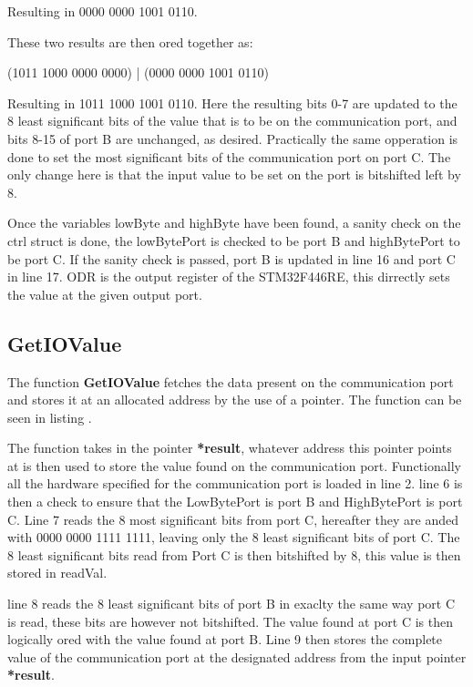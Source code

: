 Resulting in 0000 0000 1001 0110. 

These two results are then ored together as:

(1011 1000 0000 0000) | (0000 0000 1001 0110) 

Resulting in 1011 1000 1001 0110. Here the resulting bits 0-7 are updated to the 8 least significant bits of the value that is to be on the communication port, and bits 8-15 of port B are unchanged, as desired. Practically the same opperation is done to set the most significant bits of the communication port on port C. The only change here is that the input value to be set on the port is bitshifted left by 8.

Once the variables lowByte and highByte have been found, a sanity check on the ctrl struct is done, the lowBytePort is checked to be port B and highBytePort to be port C. If the sanity check is passed, port B is updated in line 16 and port C in line 17. ODR is the output register of the STM32F446RE, this dirrectly sets the value at the given output port.

\subsection*{GetIOValue}
The function \textbf{GetIOValue} fetches the data present on the communication port and stores it at an allocated address by the use of a pointer. The function can be seen in listing .



The function takes in the pointer \textbf{*result}, whatever address this pointer points at is then used to store the value found on the communication port. Functionally all the hardware specified for the communication port is loaded in line 2. line 6 is then a check to ensure that the LowBytePort is port B and HighBytePort is port C. Line 7 reads the 8 most significant bits from port C, hereafter they are anded with 0000 0000 1111 1111, leaving only the 8 least significant bits of port C. The 8 least significant bits read from Port C is then bitshifted by 8, this value is then stored in readVal.

line 8 reads the 8 least significant bits of port B in exaclty the same way port C is read, these bits are however not bitshifted. The value found at port C is then logically ored with the value found at port B. Line 9 then stores the complete value of the communication port at the designated address from the input pointer \textbf{*result}.

